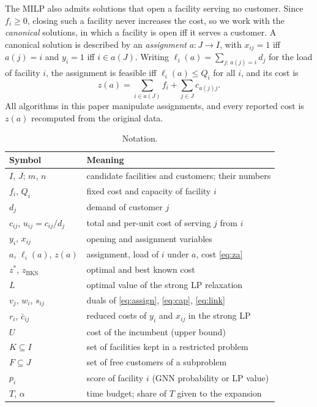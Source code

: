 The MILP also admits solutions that open a facility serving no customer. Since $f_i\ge0$,
closing such a facility never increases the cost, so we work with the \emph{canonical} solutions,
in which a facility is open iff it serves a customer. A canonical solution is described by an
\emph{assignment} $a:J\to I$, with $x_{ij}=1$ iff $a(j)=i$ and $y_i=1$ iff $i\in a(J)$. Writing
$\ell_i(a)=\sum_{j:\,a(j)=i} d_j$ for the load of facility $i$, the assignment is feasible iff
$\ell_i(a)\le Q_i$ for all $i$, and its cost is
\begin{equation}\label{eq:za}
z(a)=\sum_{i\in a(J)} f_i+\sum_{j\in J} c_{a(j)j}.
\end{equation}
All algorithms in this paper manipulate assignments, and every reported cost is $z(a)$ recomputed
from the original data.

\begin{table}[t]\centering\small
\caption{Notation.}\label{tab:notation}
\begin{tabular}{ll}
\toprule
Symbol & Meaning \\
\midrule
$I$, $J$; $m$, $n$ & candidate facilities and customers; their numbers \\
$f_i$, $Q_i$ & fixed cost and capacity of facility $i$ \\
$d_j$ & demand of customer $j$ \\
$c_{ij}$, $u_{ij}=c_{ij}/d_j$ & total and per-unit cost of serving $j$ from $i$ \\
$y_i$, $x_{ij}$ & opening and assignment variables \\
$a$, $\ell_i(a)$, $z(a)$ & assignment, load of $i$ under $a$, cost \eqref{eq:za} \\
$z^\ast$, $z_{\mathrm{BKS}}$ & optimal and best known cost \\
$L$ & optimal value of the strong LP relaxation \\
$v_j$, $w_i$, $s_{ij}$ & duals of \eqref{eq:assign}, \eqref{eq:cap}, \eqref{eq:link} \\
$r_i$, $\bar c_{ij}$ & reduced costs of $y_i$ and $x_{ij}$ in the strong LP \\
$U$ & cost of the incumbent (upper bound) \\
$K\subseteq I$ & set of facilities kept in a restricted problem \\
$F\subseteq J$ & set of free customers of a subproblem \\
$p_i$ & score of facility $i$ (GNN probability or LP value) \\
$T$, $\alpha$ & time budget; share of $T$ given to the expansion \\
\bottomrule
\end{tabular}
\end{table}

